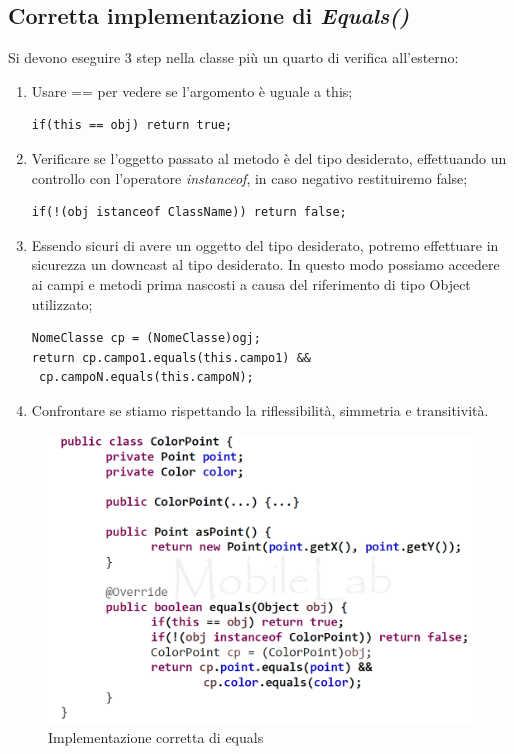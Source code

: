 \subsection{Corretta implementazione di \textit{Equals()}}
Si devono eseguire 3 step nella classe più un quarto di verifica all'esterno:
\begin{enumerate}
\item Usare == per vedere se l'argomento è uguale a this;
\begin{lstlisting}
if(this == obj) return true;
\end{lstlisting}

\item Verificare se l’oggetto passato al metodo è del tipo desiderato, effettuando un controllo con l’operatore \textit{instanceof}, in caso negativo restituiremo false;
\begin{lstlisting}
if(!(obj istanceof ClassName)) return false;
\end{lstlisting}

\item Essendo sicuri di avere un oggetto del tipo desiderato, potremo effettuare in sicurezza un downcast al tipo desiderato. In questo modo possiamo accedere ai campi e metodi prima nascosti a causa del riferimento di tipo Object utilizzato;
\begin{lstlisting}
NomeClasse cp = (NomeClasse)ogj;
return cp.campo1.equals(this.campo1) &&
 cp.campoN.equals(this.campoN);
\end{lstlisting}

\item Confrontare se stiamo rispettando la riflessibilità, simmetria e transitività.
\end{enumerate}

\begin{figure}[H]
\centering
\includegraphics[scale=0.42]{images/imgEquals}
\caption{Implementazione corretta di equals\label{fig:UC3}}
\end{figure}


